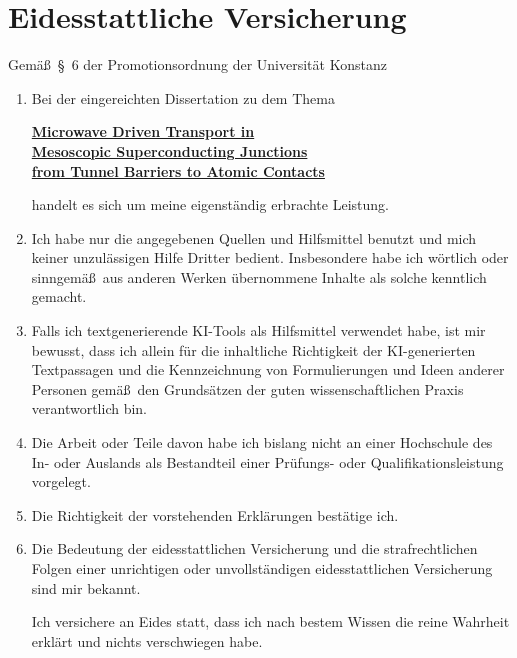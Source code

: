 
\pagestyle{eidesstattlicheversicherung}
\thispagestyle{eidesstattlicheversicherung}

\section*{Eidesstattliche Versicherung}

    Gemä\ss\ \S~6 der Promotionsordnung der Universität Konstanz

    \begin{enumerate}
        \item Bei der eingereichten Dissertation zu dem Thema

        \begin{center}
            \underline{\textbf{Microwave Driven Transport in}}\\
            \underline{\textbf{Mesoscopic Superconducting Junctions}}\\
            \underline{\textbf{from Tunnel Barriers to Atomic Contacts}}
        \end{center}

        handelt es sich um meine eigenständig erbrachte Leistung.

        \item Ich habe nur die angegebenen Quellen und Hilfsmittel benutzt und mich keiner unzulässigen Hilfe Dritter bedient. Insbesondere habe ich wörtlich oder sinngemä\ss\ aus anderen Werken übernommene Inhalte als solche kenntlich gemacht.

        \item Falls ich textgenerierende KI-Tools als Hilfsmittel verwendet habe, ist mir bewusst, dass ich allein für die inhaltliche Richtigkeit der KI-generierten Textpassagen und die Kennzeichnung von Formulierungen und Ideen anderer Personen gemä\ss\ den Grundsätzen der guten wissenschaftlichen Praxis verantwortlich bin.

        \item Die Arbeit oder Teile davon habe ich bislang nicht an einer Hochschule des In- oder Auslands als Bestandteil einer Prüfungs- oder Qualifikationsleistung vorgelegt.

        \item Die Richtigkeit der vorstehenden Erklärungen bestätige ich.

        \item Die Bedeutung der eidesstattlichen Versicherung und die strafrechtlichen Folgen einer unrichtigen oder unvollständigen eidesstattlichen Versicherung sind mir bekannt.

        Ich versichere an Eides statt, dass ich nach bestem Wissen die reine Wahrheit erklärt und nichts verschwiegen habe.
    \end{enumerate}

